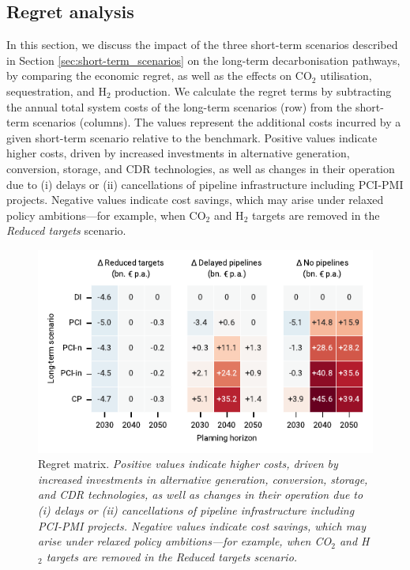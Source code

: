 \documentclass[pdflatex,sn-nature]{sn-jnl}%
\theoremstyle{thmstyleone}%
\theoremstyle{thmstyletwo}%
\theoremstyle{thmstylethree}%
\begin{document}
\subsection{Regret analysis}\label{sec:regret_analysis}

In this section, we discuss the impact of the three short-term scenarios described in Section \ref{sec:short-term_scenarios} on the long-term decarbonisation pathways, by comparing the economic regret, as well as the effects on CO$_2$ utilisation, sequestration, and H$_2$ production.
We calculate the regret terms by subtracting the annual total system costs of the long-term scenarios (row) from the short-term scenarios (columns). 
The values represent the additional costs incurred by a given short-term scenario relative to the benchmark. Positive values indicate higher costs, driven by increased investments in alternative generation, conversion, storage, and CDR technologies, as well as changes in their operation due to (i) delays or (ii) cancellations of pipeline infrastructure including PCI-PMI projects. Negative values indicate cost savings, which may arise under relaxed policy ambitions—for example, when CO$_2$ and H$_2$ targets are removed in the \textit{Reduced targets} scenario.


\begin{figure}[t]
  \centering
  \includegraphics{figures/regret_matrix}
  \caption{Regret matrix. \textit{Positive values indicate higher costs, driven by increased investments in alternative generation, conversion, storage, and CDR technologies, as well as changes in their operation due to (i) delays or (ii) cancellations of pipeline infrastructure including PCI-PMI projects. Negative values indicate cost savings, which may arise under relaxed policy ambitions—for example, when CO$_2$ and H$_2$ targets are removed in the \textit{Reduced targets} scenario.}}
  \label{fig:regret_matrix_results}
\end{figure}
\end{document}
